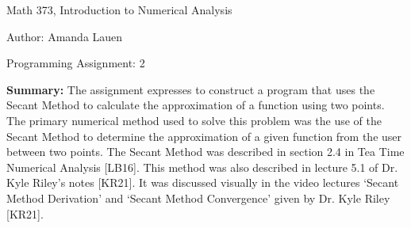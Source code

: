 \documentclass{article}
\begin{document}

\large

{\Large Math 373, Introduction to Numerical Analysis}

\begin{center}
{\Large Author: \hfill Amanda Lauen} %
\end{center}
\par \medskip \par
{\Large Programming Assignment: 2} 
\par \bigskip \par

{\bf Summary:} {\color{black} The assignment expresses to construct a program that uses the Secant Method to calculate the approximation of a function using two points.  The primary numerical method used to solve this problem was the use of the Secant Method to determine the approximation of a given function from the user between two points.  The Secant Method was described in section 2.4 in Tea Time Numerical Analysis [LB16].  This method was also described in lecture 5.1 of Dr. Kyle Riley’s notes [KR21]. It was discussed visually in the video lectures ‘Secant Method Derivation’ and ‘Secant Method Convergence’ given by Dr. Kyle Riley [KR21].} 
\par \bigskip \par
\end{document}
